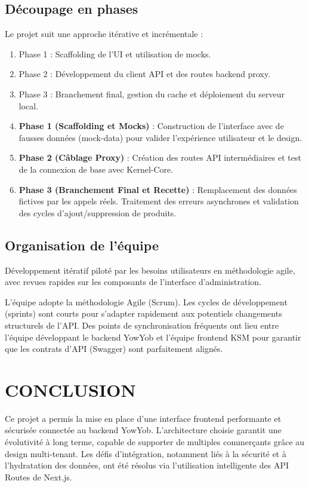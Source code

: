 \documentclass[12pt, a4paper]{report}
\begin{document}
\section{Découpage en phases}
Le projet suit une approche itérative et incrémentale :
\begin{enumerate}
    \item Phase 1 : Scaffolding de l'UI et utilisation de mocks.
    \item Phase 2 : Développement du client API et des routes backend proxy.
    \item Phase 3 : Branchement final, gestion du cache et déploiement du serveur local.
    \item \textbf{Phase 1 (Scaffolding et Mocks)} : Construction de l'interface avec de fausses données (mock-data) pour valider l'expérience utilisateur et le design.
    \item \textbf{Phase 2 (Câblage Proxy)} : Création des routes API intermédiaires et test de la connexion de base avec Kernel-Core.
    \item \textbf{Phase 3 (Branchement Final et Recette)} : Remplacement des données fictives par les appels réels. Traitement des erreurs asynchrones et validation des cycles d'ajout/suppression de produits.
\end{enumerate}
\section{Organisation de l'équipe}
Développement itératif piloté par les besoins utilisateurs en méthodologie agile, avec revues rapides sur les composants de l'interface d'administration.

L'équipe adopte la méthodologie Agile (Scrum). Les cycles de développement (sprints) sont courts pour s'adapter rapidement aux potentiels changements structurels de l'API. Des points de synchronisation fréquents ont lieu entre l'équipe développant le backend YowYob et l'équipe frontend KSM pour garantir que les contrats d'API (Swagger) sont parfaitement alignés.
\chapter*{CONCLUSION}
Ce projet a permis la mise en place d'une interface frontend performante et sécurisée connectée au backend YowYob. L'architecture choisie garantit une évolutivité à long terme, capable de supporter de multiples commerçants grâce au design multi-tenant. Les défis d'intégration, notamment liés à la sécurité et à l'hydratation des données, ont été résolus via l'utilisation intelligente des API Routes de Next.js.
\onehalfspacing
\end{document}
